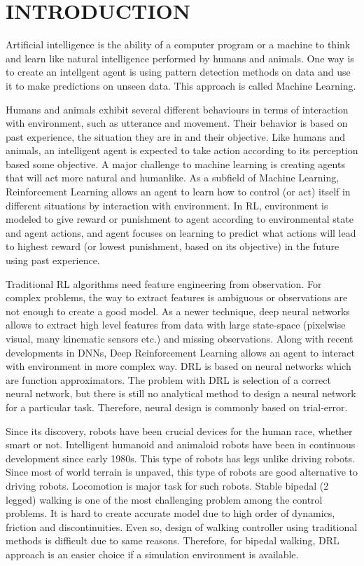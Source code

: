 \chapter{INTRODUCTION}
\label{chap:intro}

Artificial intelligence is the ability of a computer program 
or a machine to think and learn like natural intelligence 
performed by humans and animals. 
One way is to create an intellgent agent is using pattern detection  methods on data and use it to make predictions on unseen data. 
This approach is called Machine Learning. 

Humans and animals exhibit several different behaviours in terms of 
interaction with environment, such as utterance and movement. 
Their behavior is based on past experience, the situation they are in  and their objective. 
Like humans and animals, an intelligent agent is expected to take 
action according to its perception based some objective. 
A major challenge to machine learning is creating agents that will 
act more natural and humanlike. 
As a subfield of Machine Learning, Reinforcement Learning allows an 
agent to learn how to control (or act) itself in different situations by interaction with environment. 
In RL, environment is modeled to give reward or punishment to agent 
according to environmental state and agent actions, and agent focuses
on learning to predict what actions will lead to highest reward 
(or lowest punishment, based on its objective) in the future using past experience. 

Traditional RL algorithms need feature engineering from observation. 
For complex problems, the way to extract features is ambiguous or 
observations are not enough to create a good model. 
As a newer  technique, deep neural networks allows to extract 
high level features from data with large state-space 
(pixelwise visual, many kinematic sensors etc.) and missing  observations. 
Along with recent developments in DNNs, Deep Reinforcement Learning 
allows an agent to interact with environment in more complex way. 
DRL is based on neural networks which are function approximators. 
The problem with DRL is selection of a correct neural network, 
but there is still no analytical method to design a neural network for a particular task. 
Therefore, neural design is commonly based on trial-error. 

Since its discovery, robots have been crucial devices for the human race, whether smart or not. 
Intelligent humanoid and animaloid robots have been in 
continuous development since early 1980s. 
This type of robots has legs unlike driving robots. 
Since most of world terrain is unpaved, this type of robots are good alternative to driving robots. 
Locomotion is major task for such robots. Stable bipedal (2 legged)  walking 
is one of the most challenging problem among the control problems. 
It is hard to create accurate model due to high order of dynamics, 
friction and discontinuities. 
Even so, design of walking controller using traditional methods is difficult due to same reasons. 
Therefore, for bipedal walking, DRL approach is an easier choice if a simulation environment is available. 

